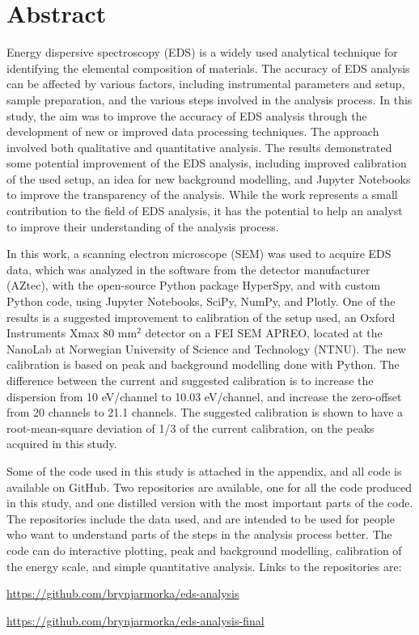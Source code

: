 \chapter*{Abstract}

Energy dispersive spectroscopy (EDS) is a widely used analytical technique for identifying the elemental composition of materials.
The accuracy of EDS analysis can be affected by various factors, including instrumental parameters and setup, sample preparation, and the various steps involved in the analysis process.
In this study, the aim was to improve the accuracy of EDS analysis through the development of new or improved data processing techniques.
The approach involved both qualitative and quantitative analysis.
The results demonstrated some potential improvement of the EDS analysis, including improved calibration of the used setup, an idea for new background modelling, and Jupyter Notebooks to improve the transparency of the analysis.
While the work represents a small contribution to the field of EDS analysis, it has the potential to help an analyst to improve their understanding of the analysis process.


In this work, a scanning electron microscope (SEM) was used to acquire EDS data, which was analyzed in the software from the detector manufacturer (AZtec), with the open-source Python package HyperSpy, and with custom Python code, using Jupyter Notebooks, SciPy, NumPy, and Plotly.
One of the results is a suggested improvement to calibration of the setup used, an Oxford Instruments Xmax 80 mm$^2$ detector on a FEI SEM APREO, located at the NanoLab at Norwegian University of Science and Technology (NTNU).
The new calibration is based on peak and background modelling done with Python.
The difference between the current and suggested calibration is to increase the dispersion from 10 eV/channel to 10.03 eV/channel, and increase the zero-offset from 20 channels to 21.1 channels.
The suggested calibration is shown to have a root-mean-square deviation of 1/3 of the current calibration, on the peaks acquired in this study.

Some of the code used in this study is attached in the appendix, and all code is available on GitHub.
Two repositories are available, one for all the code produced in this study, and one distilled version with the most important parts of the code.
The repositories include the data used, and are intended to be used for people who want to understand parts of the steps in the analysis process better.
The code can do interactive plotting, peak and background modelling, calibration of the energy scale, and simple quantitative analysis.
Links to the repositories are:

\url{https://github.com/brynjarmorka/eds-analysis}

\url{https://github.com/brynjarmorka/eds-analysis-final}



